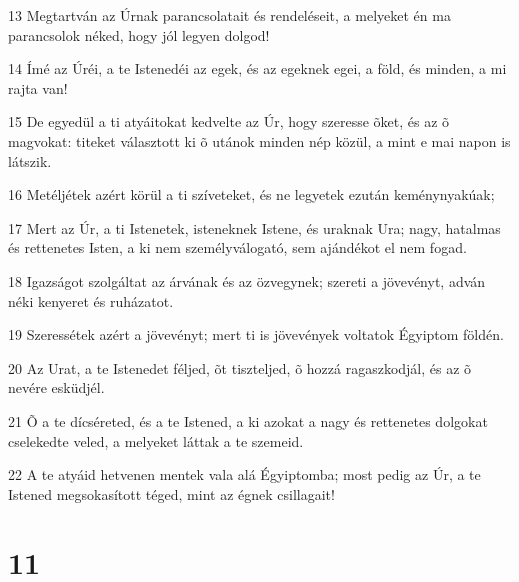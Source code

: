 \par 13 Megtartván az Úrnak parancsolatait és rendeléseit, a melyeket én ma parancsolok néked, hogy jól legyen dolgod!
\par 14 Ímé az Úréi, a te Istenedéi az egek, és az egeknek egei, a föld, és minden, a mi rajta van!
\par 15 De egyedül a ti atyáitokat kedvelte az Úr, hogy szeresse õket, és az õ magvokat: titeket választott ki õ utánok minden nép közül, a mint e mai napon is látszik.
\par 16 Metéljétek azért körül a ti szíveteket, és ne legyetek  ezután keménynyakúak;
\par 17 Mert az Úr, a ti Istenetek, isteneknek Istene, és uraknak Ura; nagy, hatalmas és rettenetes Isten, a ki nem személyválogató, sem ajándékot el nem fogad.
\par 18 Igazságot szolgáltat az árvának és az özvegynek; szereti a jövevényt, adván néki kenyeret és ruházatot.
\par 19 Szeressétek azért a jövevényt; mert ti is jövevények voltatok Égyiptom földén.
\par 20 Az Urat, a te Istenedet féljed, õt tiszteljed, õ hozzá ragaszkodjál, és az õ nevére esküdjél.
\par 21 Õ a te dícséreted, és a te Istened, a ki azokat a nagy és rettenetes dolgokat cselekedte veled, a melyeket láttak a te szemeid.
\par 22 A te atyáid hetvenen mentek vala alá Égyiptomba; most pedig az Úr, a te Istened megsokasított téged, mint az égnek csillagait!

\chapter{11}

